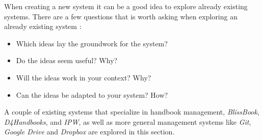 When creating a new system it can be a good idea to explore already existing systems.
There are a few questions that is worth asking when exploring an already existing system \citep[p.~33]{Rod-Aalborg}:

\begin{itemize}
  \item Which ideas lay the groundwork for the system?
  \item Do the ideas seem useful? Why?
  \item Will the ideas work in your context? Why?
  \item Can the ideas be adapted to your system? How?
\end{itemize}


A couple of existing systems that specialize in handbook management, \textit{BlissBook}, \textit{D4Handbooks}, and \textit{IPW}, as well as more general management systems like \textit{Git}, \textit{Google Drive} and \textit{Dropbox} are explored in this section.

